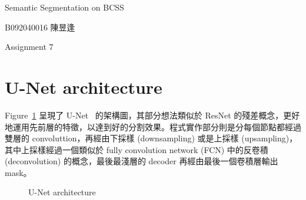 \documentclass[a4paper,12pt]{article}   %
\begin{document}

\begin{center}
	{\fontsize{16pt}{12pt}\selectfont Semantic Segmentation on BCSS}
	
\end{center}

\hfill  B092040016 陳昱逢
	
	
\begin{center}
	Assignment 7
\end{center}

\section{U-Net architecture}
	Figure\ \ref{fig:unet} 呈現了 U-Net\ \cite{unet} 的架構圖，其部分想法類似於 ResNet 的殘差概念，更好地運用先前層的特徵，以達到好的分割效果。程式實作部分則是分每個節點都經過雙層的 convoluttion，再經由下採樣 (downsampling) 或是上採樣 (upsampling)，其中上採樣經過一個類似於 fully convolution network (FCN) 中的反卷積 (deconvolution) 的概念，最後最淺層的 decoder 再經由最後一個卷積層輸出 mask。


\begin{figure}[htb]
  \vspace{0.1\baselineskip}  
  \centering  
    \caption{U-Net architecture\ \cite{unet}}
    \label{fig:unet}

  \vspace{0.1\baselineskip}
\end{figure}	
\end{document}
